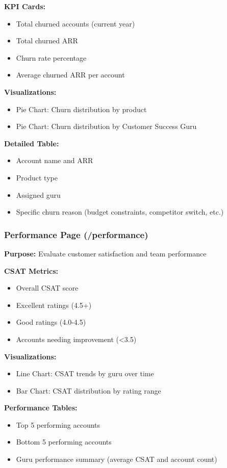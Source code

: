 \documentclass[12pt,a4paper]{article}
\begin{document}
\textbf{KPI Cards:}
\begin{itemize}
    \item Total churned accounts (current year)
    \item Total churned ARR
    \item Churn rate percentage
    \item Average churned ARR per account
\end{itemize}

\textbf{Visualizations:}
\begin{itemize}
    \item Pie Chart: Churn distribution by product
    \item Pie Chart: Churn distribution by Customer Success Guru
\end{itemize}

\textbf{Detailed Table:}
\begin{itemize}
    \item Account name and ARR
    \item Product type
    \item Assigned guru
    \item Specific churn reason (budget constraints, competitor switch, etc.)
\end{itemize}

\subsubsection{Performance Page (/performance)}

\textbf{Purpose:} Evaluate customer satisfaction and team performance

\textbf{CSAT Metrics:}
\begin{itemize}
    \item Overall CSAT score
    \item Excellent ratings (4.5+)
    \item Good ratings (4.0-4.5)
    \item Accounts needing improvement (<3.5)
\end{itemize}

\textbf{Visualizations:}
\begin{itemize}
    \item Line Chart: CSAT trends by guru over time
    \item Bar Chart: CSAT distribution by rating range
\end{itemize}

\textbf{Performance Tables:}
\begin{itemize}
    \item Top 5 performing accounts
    \item Bottom 5 performing accounts
    \item Guru performance summary (average CSAT and account count)
\end{itemize}
\end{document}
